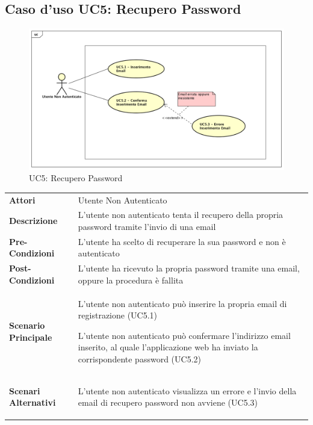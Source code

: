 \newpage
\subsection{Caso d'uso UC5:  Recupero Password }
\label{UC5}
\begin{figure}[ht]
	\centering
	\includegraphics[scale=0.45]{UML/UC5.png}
	\caption{UC5: Recupero Password }
\end{figure}

\begin{longtable}{ l | p{11cm}}
	\hline
	\rowcolor{Gray}
	 \multicolumn{2}{c}{UC5 - Recupero Password} \\
	 \hline
	\textbf{Attori} & Utente Non Autenticato \\
	\textbf{Descrizione} & L'utente non autenticato tenta il recupero della propria password tramite l'invio di una email \\
	\textbf{Pre-Condizioni} & L'utente ha scelto di recuperare la sua password e non è autenticato \\
	\textbf{Post-Condizioni} & L'utente ha ricevuto la propria password tramite una email, oppure la procedura è fallita \\
	\textbf{Scenario Principale} & 
	\begin{enumerate*}[label=(\arabic*.),itemjoin={\newline}]
		\item L'utente non autenticato può inserire la propria email di registrazione (UC5.1)
		\item L'utente non autenticato può confermare l'indirizzo email inserito, al quale l'applicazione web ha inviato la corrispondente password (UC5.2)
	\end{enumerate*}\\
	\textbf{Scenari Alternativi} & 
	\begin{enumerate*}[label=(\arabic*.),itemjoin={\newline}]
		\item L'utente non autenticato visualizza un errore e l'invio della email di recupero password non avviene (UC5.3) 
	\end{enumerate*}\\
\end{longtable}